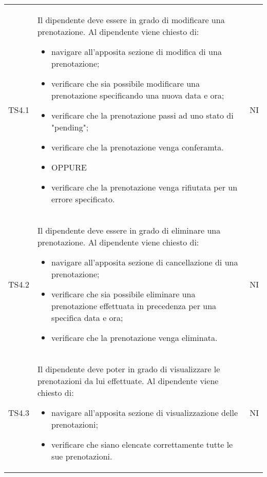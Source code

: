 {\begin{longtable}{ c C{11cm} c }
        TS4.1&
        \begin{flushleft}
            Il dipendente deve essere in grado di modificare una prenotazione.
            Al dipendente viene chiesto di:
        \end{flushleft}
        \begin{itemize}
            \item navigare all'apposita sezione di modifica di una prenotazione;
            \item verificare che sia possibile modificare una prenotazione specificando una nuova data e ora;
            \item verificare che la prenotazione passi ad uno stato di "pending";
            \item verificare che la prenotazione venga conferamta.
            \item [] OPPURE
            \item verificare che la prenotazione venga rifiutata per un errore specificato.
        \end{itemize}&
        NI\\

        TS4.2&
        \begin{flushleft}
            Il dipendente deve essere in grado di eliminare una prenotazione.
            Al dipendente viene chiesto di:
        \end{flushleft}
        \begin{itemize}
            \item navigare all'apposita sezione di cancellazione di una prenotazione;
            \item verificare che sia possibile eliminare una prenotazione effettuata in precedenza per una specifica data e ora;
            \item verificare che la prenotazione venga eliminata.
        \end{itemize}&
        NI\\

        TS4.3&
        \begin{flushleft}
            Il dipendente deve poter in grado di visualizzare le prenotazioni da lui effettuate.
            Al dipendente viene chiesto di:
        \end{flushleft}
        \begin{itemize}
            \item navigare all'apposita sezione di visualizzazione delle prenotazioni;
            \item verificare che siano elencate correttamente tutte le sue prenotazioni.
        \end{itemize}&
        NI\\


\end{longtable}}
